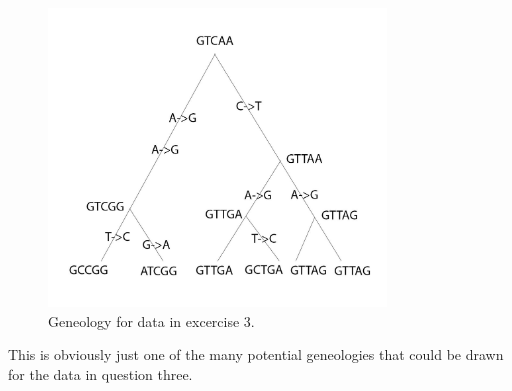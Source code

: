 \documentclass[11pt, oneside]{article}
\begin{document}
\begin{figure}[!htbp]
    \centering
    \includegraphics[width=0.8\textwidth]{./Figures/Ch1Q6.jpg}
    \caption{Geneology for data in excercise 3.}
    \label{fig:Ch1Q6gen}
\end{figure}

This is obviously just one of the many potential geneologies that could be drawn for the data
in question three.
\end{document}
